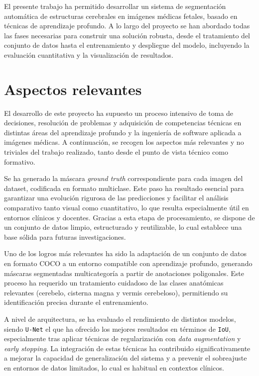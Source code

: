 
El presente trabajo ha permitido desarrollar un sistema de segmentación automática de estructuras cerebrales en imágenes médicas fetales, basado en técnicas de aprendizaje profundo. A lo largo del proyecto se han abordado todas las fases necesarias para construir una solución robusta, desde el tratamiento del conjunto de datos hasta el entrenamiento y despliegue del modelo, incluyendo la evaluación cuantitativa y la visualización de resultados.

\section{Aspectos relevantes}

El desarrollo de este proyecto ha supuesto un proceso intensivo de toma de decisiones, resolución de problemas y adquisición de competencias técnicas en distintas áreas del aprendizaje profundo y la ingeniería de software aplicada a imágenes médicas. A continuación, se recogen los aspectos más relevantes y no triviales del trabajo realizado, tanto desde el punto de vista técnico como formativo.

Se ha generado la máscara \textit{ground truth} correspondiente para cada imagen del dataset, codificada en formato multiclase. Este paso ha resultado esencial para garantizar una evolución rigurosa de las predicciones y facilitar el análisis comparativo tanto visual como cuantitativo, lo que resulta especialmente útil en entornos clínicos y docentes. Gracias a esta etapa de procesamiento, se dispone de un conjunto de datos limpio, estructurado y reutilizable, lo cual establece una base sólida para futuras investigaciones.

Uno de los logros más relevantes ha sido la adaptación de un conjunto de datos en formato COCO a un entorno compatible con aprendizaje profundo, generando máscaras segmentadas multicategoría a partir de anotaciones poligonales. Este proceso ha requerido un tratamiento cuidadoso de las clases anatómicas relevantes (cerebelo, cisterna magna y vermis cerebeloso), permitiendo su identificación precisa durante el entrenamiento.

A nivel de arquitectura, se ha evaluado el rendimiento de distintos modelos, siendo \texttt{U-Net} el que ha ofrecido los mejores resultados en términos de \texttt{IoU}, especialmente tras aplicar técnicas de regularización con \textit{data augmentation} y \textit{early stopping}. La integración de estas técnicas ha contribuido significativamente a mejorar la capacidad de generalización del sistema y a prevenir el sobreajuste en entornos de datos limitados, lo cual es habitual en contextos clínicos.

